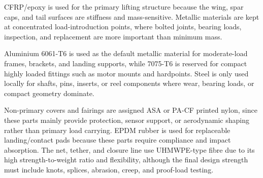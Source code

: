 
 CFRP/epoxy is used for the primary lifting structure because the wing, spar caps, and tail surfaces are stiffness and mass-sensitive. Metallic materials are kept at concentrated load-introduction points, where bolted joints, bearing loads, inspection, and replacement are more important than minimum mass.

Aluminium 6061-T6 is used as the default metallic material for moderate-load frames, brackets, and landing supports, while 7075-T6 is reserved for compact highly loaded fittings such as motor mounts and hardpoints. Steel is only used locally for shafts, pins, inserts, or reel components where wear, bearing loads, or compact geometry dominate.

Non-primary covers and fairings are assigned ASA or PA-CF printed nylon, since these parts mainly provide protection, sensor support, or aerodynamic shaping rather than primary load carrying. EPDM rubber is used for replaceable landing/contact pads because these parts require compliance and impact absorption. The net, tether, and closure line use UHMWPE-type fibre due to its high strength-to-weight ratio and flexibility, although the final design strength must include knots, splices, abrasion, creep, and proof-load testing.





